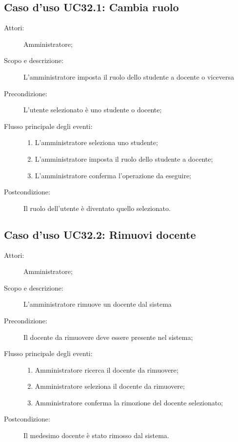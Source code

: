 \subsection{Caso d'uso UC32.1: Cambia ruolo}\begin{description}
\item[Attori:] Amministratore;
\item[Scopo e descrizione:] L'amministratore imposta il ruolo dello studente a docente o viceversa
      \item[Precondizione:] L'utente selezionato è uno studente o docente;

        \item[Flusso principale degli eventi:] \begin{enumerate}
          \item L'amministratore seleziona uno studente;
          \item L'amministratore imposta il ruolo dello studente a docente;
          \item L'amministratore conferma l'operazione da eseguire;

      \end{enumerate}
    \item[Postcondizione:] Il ruolo dell'utente è diventato quello selezionato.
  \end{description}
\hypertarget{UC32.2}{}
\subsection{Caso d'uso UC32.2: Rimuovi  docente}\begin{description}
\item[Attori:] Amministratore;
\item[Scopo e descrizione:] L'amministratore rimuove un docente dal sistema
      \item[Precondizione:] Il docente da rimuovere deve essere presente nel sistema;

        \item[Flusso principale degli eventi:] \begin{enumerate}
          \item Amministratore ricerca il docente da rimuovere;
          \item Amministratore seleziona il docente da rimuovere;
          \item Amministratore conferma la rimozione del docente selezionato;

      \end{enumerate}
    \item[Postcondizione:] Il medesimo docente è stato rimosso dal sistema.
  \end{description}
\hypertarget{UC33}{}
